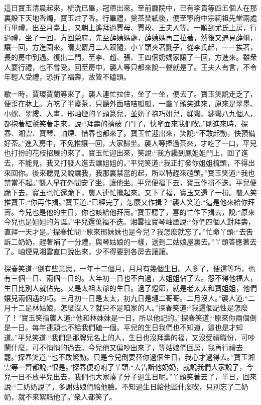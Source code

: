 \begin{parag}
    這日寶玉清晨起來，梳洗已畢，冠帶出來。至前廳院中，已有李貴等四五個人在那裏設下天地香燭，寶玉炷了香。行畢禮，奠茶焚紙後，便至寧府中宗祠祖先堂兩處行畢禮，出至月臺上，又朝上遙拜過賈母、賈政、王夫人等。一順到尤氏上房，行過禮，坐了一回，方回榮府。先至薛姨媽處，薛姨媽再三拉著，然後又遇見薛蝌，讓一回，方進園來。晴雯麝月二人跟隨，小丫頭夾著氈子，從李氏起，一一挨著，長的房中到過。復出二門，至李、趙、張、王四個奶媽家讓了一回，方進來。雖衆人要行禮，也不曾受。回至房中，襲人等只都來說一聲就是了。王夫人有言，不令年輕人受禮，恐折了福壽，故皆不磕頭。
\end{parag}


\begin{parag}
    歇一時，賈環賈蘭等來了，襲人連忙拉住，坐了一坐，便去了。寶玉笑說走乏了，便歪在牀上。方吃了半盞茶，只聽外面咭咭呱呱，一羣丫頭笑進來，原來是翠墨、小螺、翠縷、入畫，邢岫煙的丫頭篆兒，並奶子抱巧姐兒，綵鸞、繡鸞八九個人，都抱著紅氈笑著走來，說:“拜壽的擠破了門了，快拿面來我們喫。”剛進來時，探春、湘雲、寶琴、岫煙、惜春也都來了。寶玉忙迎出來，笑說:“不敢起動，快預備好茶。”進入房中，不免推讓一回，大家歸坐。襲人等捧過茶來，才吃了一口，平兒也打扮的花枝招展的來了。寶玉忙迎出來，笑說:“我方纔到鳳姐姐門上，回了進去，不能見，我又打發人進去讓姐姐的。”平兒笑道:“我正打發你姐姐梳頭，不得出來回你。後來聽見又說讓我，我那裏禁當的起，所以特趕來磕頭。”寶玉笑道:“我也禁當不起。”襲人早在外間安了坐，讓他坐。平兒便福下去，寶玉作揖不迭。平兒便跪下去，寶玉也忙還跪下，襲人連忙攙起來。又下了福，寶玉又還了一揖。襲人笑推寶玉:“你再作揖。”寶玉道:“已經完了，怎麼又作揖？”襲人笑道:“這是他來給你拜壽。今兒也是他的生日，你也該給他拜壽。”寶玉聽了，喜的忙作下揖去，說:“原來今兒也是姐姐的芳誕。”平兒還萬福不迭。湘雲拉寶琴岫煙說:“你們四個人對拜壽，直拜一天才是。”探春忙問:“原來邢妹妹也是今兒？我怎麼就忘了。”忙命丫頭:“去告訴二奶奶，趕著補了一分禮，與琴姑娘的一樣，送到二姑娘屋裏去。”丫頭答應著去了。岫煙見湘雲直口說出來，少不得要到各房去讓讓。
\end{parag}


\begin{parag}
    探春笑道:“倒有些意思，一年十二個月，月月有幾個生日。人多了，便這等巧，也有三個一日、兩個一日的。大年初一日也不白過，大姐姐佔了去。怨不得他福大，生日比別人就佔先。又是太祖太爺的生日。過了燈節，就是老太太和寶姐姐，他們孃兒兩個遇的巧。三月初一日是太太，初九日是璉二哥哥。二月沒人。”襲人道:“二月十二是林姑娘，怎麼沒人？就只不是咱家的人。”探春笑道:“我這個記性是怎麼了！”寶玉笑指襲人道:“他和林妹妹是一日，所以他記的。”探春笑道:“原來你兩個倒是一日。每年連頭也不給我們磕一個。平兒的生日我們也不知道，這也是才知道。”平兒笑道:“我們是那牌兒名上的人，生日也沒拜壽的福，又沒受禮職份，可吵鬧什麼，可不悄悄的過去。今兒他又偏吵出來了，等姑娘們回房，我再行禮去罷。”探春笑道:“也不敢驚動。只是今兒倒要替你過個生日，我心才過得去。”寶玉湘雲等一齊都說:“很是。”探春便吩咐了丫頭:“去告訴他奶奶，就說我們大家說了，今兒一日不放平兒出去，我們也大家湊了分子過生日呢。”丫頭笑著去了，半日，回來說:“二奶奶說了，多謝姑娘們給他臉。不知過生日給他些什麼喫，只別忘了二奶奶，就不來絮聒他了。”衆人都笑了。
\end{parag}


